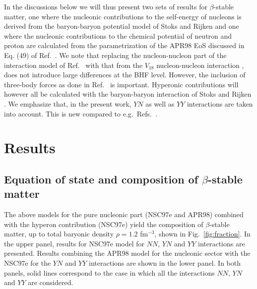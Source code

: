 In the discussions below we will thus present two sets of results for
$\beta$-stable matter, one where the nucleonic contributions
to the self-energy of nucleons is derived from the baryon-baryon potential
model of Stoks  and Rijken \cite{sr99} and one where the nucleonic 
contributions to the chemical potential of neutron and proton are
calculated from the parametrization of the APR98 EoS discussed in 
Eq. (49) of  Ref.\ \cite{hh99}. We note that replacing the nucleon-nucleon 
part of the interaction model of
Ref.\ \cite{sr99} with that from the
$V_{18}$ nucleon-nucleon interaction \cite{v18}, 
does not introduce large differences at the BHF level. However,
the inclusion of three-body forces as done in Ref.\ \cite{apr98} is 
important.
Hyperonic contributions
will however all be calculated with the baryon-baryon interaction of
Stoks  and Rijken \cite{sr99}. We emphasize that, in the present work, 
$YN$ as well as $YY$ interactions are taken into account. This is new compared
to e.g.~Refs.~\cite{bbs98,bbs00}.


\section{Results}
\label{sec:sec3}

\subsection{Equation of state and composition of $\beta$-stable matter}
\label{sec:sec3a}

The above models for the pure nucleonic part (NSC97e and APR98)
combined with the hyperon contribution (NSC97e)
yield the composition of $\beta$-stable matter, up to total
baryonic density $\rho=1.2$ fm$^{-3}$, shown in Fig.\  \ref{fig:fraction}.
In the upper panel, results for NSC97e model for $NN$, $YN$ and $YY$
interactions are presented. Results combining the APR98 model for
the nucleonic sector with the 
NSC97e for the $YN$ and $YY$ interactions are shown in the lower panel. 
In both
panels, solid lines correspond to the case in which all the interactions
$NN$, $YN$ and $YY$ are considered. 

